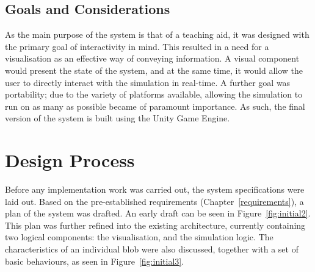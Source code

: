 \subsection{Goals and Considerations}

As the main purpose of the system is that of a teaching aid, it was designed with the primary goal of interactivity in mind. This resulted in a need for a visualisation as an effective way of conveying information. A visual component would present the state of the system, and at the same time, it would allow the user to directly interact with the simulation in real-time. A further goal was portability; due to the variety of platforms available, allowing the simulation to run on as many as possible became of paramount importance. As such, the final version of the system is built using the Unity Game Engine\cite{unitywebsite}.

\section{Design Process}
Before any implementation work was carried out, the system specifications were laid out. Based on the pre-established requirements (Chapter~\ref{requirements}), a plan of the system was drafted. An early draft can be seen in Figure~\ref{fig:initial2}. This plan was further refined into the existing architecture, currently containing two logical components: the visualisation, and the simulation logic. The characteristics of an individual blob were also discussed, together with a set of basic behaviours, as seen in Figure~\ref{fig:initial3}.

